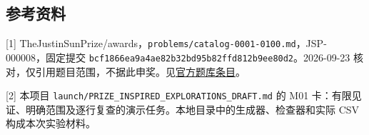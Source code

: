 \documentclass[
  11pt,
  fontset=fandol]{ctexart}
\begin{document}
\subsection{参考资料}\label{ux53c2ux8003ux8d44ux6599}

{[}1{]}
TheJustinSunPrize/awards，\texttt{problems/catalog-0001-0100.md}，JSP-000008，固定提交
\texttt{bcf1866ea9a4ae82b32bd95b82ffd812b9ee80d2}。2026-09-23
核对，仅引用题目范围，不据此申奖。见\href{https://github.com/TheJustinSunPrize/awards/blob/bcf1866ea9a4ae82b32bd95b82ffd812b9ee80d2/problems/catalog-0001-0100.md\#JSP-000008}{官方题库条目}。

{[}2{]} 本项目 \texttt{launch/PRIZE\_INSPIRED\_EXPLORATIONS\_DRAFT.md}
的 M01
卡：有限见证、明确范围及逐行复查的演示任务。本地目录中的生成器、检查器和实际
CSV 构成本次实验材料。
\end{document}
